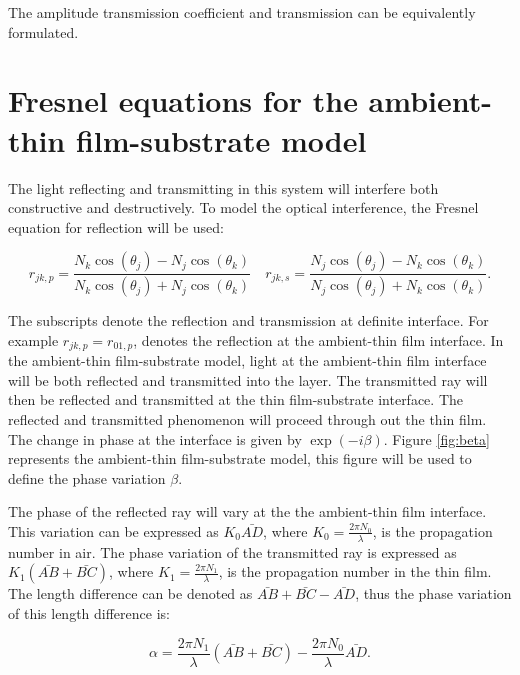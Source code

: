 \documentclass[MasterThesisMain.tex]{subfiles}
\begin{document}
The amplitude transmission coefficient and transmission can be equivalently formulated. 

\section{Fresnel equations for the ambient-thin film-substrate model}\label{ch:fresnel2lay}
The light reflecting and transmitting in this system will interfere both constructive and destructively. To model the optical interference, the Fresnel equation for reflection will be used:

\begin{equation}
r_{jk,p} = \frac{N_k\cos(\theta_j)-N_j\cos(\theta_k)}{N_k\cos(\theta_j)+N_j\cos(\theta_k)} \quad r_{jk,s} = \frac{N_j\cos(\theta_j)-N_k\cos(\theta_k)}{N_j\cos(\theta_j)+N_k\cos(\theta_k)}.
\end{equation}

The subscripts denote the reflection and transmission at definite interface. For example $r_{jk,p} = r_{01,p}$, denotes the reflection at the ambient-thin film interface. In the ambient-thin film-substrate model, light at the ambient-thin film interface will be both reflected and transmitted into the layer. The transmitted ray will then be reflected and transmitted at the thin film-substrate interface. The reflected and transmitted phenomenon will proceed through out the thin film. The change in phase at the interface is given by $\exp(-i\beta)$. Figure \ref{fig:beta} represents the ambient-thin film-substrate model, this figure will be used to define the phase variation $\beta$.

The phase of the reflected ray will vary at the the ambient-thin film interface. This variation can be expressed as $K_0\bar{AD}$, where $K_0=\frac{2\pi N_0}{\lambda}$, is the propagation number in air. The phase variation of the transmitted ray is expressed as $K_1(\bar{AB} + \bar{BC})$, where $K_1=\frac{2\pi N_1}{\lambda}$, is the propagation number in the thin film. The length difference can be denoted as $\bar{AB} + \bar{BC} - \bar{AD}$, thus the phase variation of this length difference is:

\begin{equation}\label{eq:phasealpha}
\alpha = \frac{2\pi N_1}{\lambda}(\bar{AB} + \bar{BC}) - \frac{2\pi N_0}{\lambda}\bar{AD}.
\end{equation}
\end{document}
